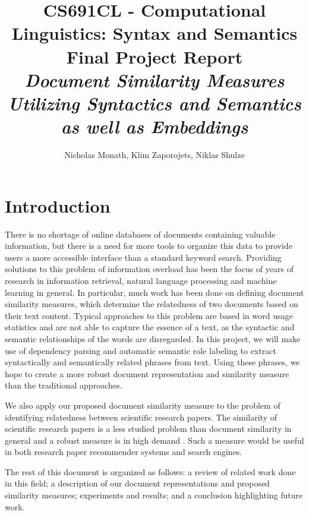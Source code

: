 \documentclass[11pt]{article}
\begin{document}
  \title{CS691CL - Computational Linguistics: Syntax and Semantics \\ Final Project Report \\ \vspace{1cm} \emph{Document Similarity Measures \\ Utilizing Syntactics and Semantics \\ as well as Embeddings}}
  \author{Nicholas Monath,  Klim Zaporojets, Niklas Shulze}
  \maketitle
  
  
  
\section{Introduction}

There is no shortage of online databases of documents containing valuable information, but there is a need for more tools to organize this data to provide users a more accessible interface than a standard keyword search. Providing solutions to this problem of information overload has been the focus of years of research in information retrieval, natural language processing and machine learning in general. In particular, much work has been done on defining document similarity measures, which determine the relatedness of two documents based on their text content. Typical approaches to this problem are based in word usage statistics and are not able to capture the essence of a text, as the syntactic and semantic relationships of the words are disregarded. In this project, we will make use of dependency parsing and automatic semantic role labeling to extract syntactically and semantically related phrases from text. Using these phrases, we hope to create a more robust document representation and similarity measure than the traditional approaches. 

We also apply our proposed document similarity measure to the problem of identifying relatedness between scientific research papers. The similarity of scientific research papers is a less studied problem than document similarity in general and a robust measure is in high demand \cite{Hurtado2013}. Such a measure would be useful in both research paper recommender systems and search engines. 

The rest of this document is organized as follows: a review of related work done in this field; a description of our document representations and proposed similarity measures; experiments and results; and a conclusion highlighting future work.
\end{document}
